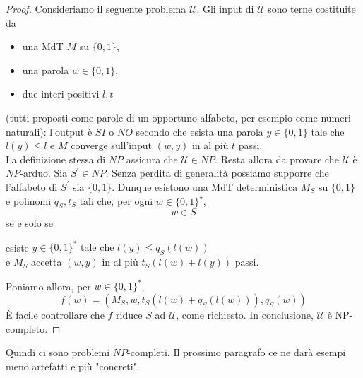 \begin{proof}
    Consideriamo il seguente problema $\mathcal{U}$. Gli input di $\mathcal{U}$
    sono terne costituite da

    \begin{itemize}
        \item una MdT $M$ su $\{0,1\}$,
        \item una parola $w \in\{0,1\}$,
        \item due interi positivi $l, t$
    \end{itemize}
    (tutti proposti come parole di un opportuno alfabeto, per esempio come
    numeri naturali): l'output è $SI$ o $NO$ secondo che esista una parola $y
        \in\{0,1\}$ tale che $l(y) \leq l$ e $M$ converge sull'input $(w, y)$ in al
    più $t$ passi.\\
    La definizione stessa di $N P$ assicura che $\mathcal{U} \in N P$. Resta
    allora da provare che $\mathcal{U}$ è $N P$-arduo. Sia $S^{\prime} \in N P$.
    Senza perdita di generalità possiamo supporre che l'alfabeto di $S^{\prime}$
    sia $\{0,1\}$. Dunque esistono una MdT deterministica $M_S$ su $\{0,1\}$ e
    polinomi $q_S, t_S$ tali che, per ogni $w \in\{0,1\}^{\star}$,
    $$
        w \in S
    $$
    se e solo se
    \begin{center}
        esiste $y \in\{0,1\}^* \text { tale che } l(y) \leq q_S(l(w))$\\
        e $M_S$ accetta $(w, y)$ in al più $t_S(l(w)+l(y))$ passi.
    \end{center}

    Poniamo allora, per $w \in\{0,1\}^*$,
    $$
        f(w)=\left(M_S, w, t_S\left(l(w)+q_S(l(w))\right), q_S(w)\right)
    $$
    È facile controllare che $f$ riduce $S$ ad $\mathcal{U}$, come richiesto. In
    conclusione, $\mathcal{U}$ è NP-completo.

\end{proof}

Quindi ci sono problemi $N P$-completi. Il prossimo paragrafo ce ne darà esempi
meno artefatti e più "concreti".